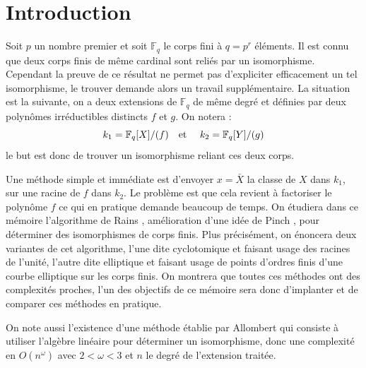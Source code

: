 \documentclass[a4paper]{article} %
\numberwithin{section}{part}
\numberwithin{equation}{section}
\newcommand\GF[1]{\mathbb{F}_{#1}}
\newcommand\etmath{\textup{\quad et \quad}}
\begin{document}
\part*{Introduction}
Soit $p$ un nombre premier et soit $\GF{q}$ le corps fini à $q = p^r$ éléments. 
Il est connu que deux corps finis de même cardinal sont reliés par un 
isomorphisme. Cependant la preuve de ce résultat ne permet pas d'expliciter
efficacement un tel isomorphisme, le trouver demande alors un travail 
supplémentaire. La situation est la suivante, on a deux extensions de 
$\GF{q}$ de même degré et définies par deux polynômes irréductibles distincts 
$f$ et $g$. On notera :
\[k_1=\GF{q}[X]/(f)\etmath k_2=\GF{q}[Y]/(g)\]
le but est donc de trouver un isomorphisme reliant ces deux corps.\par
Une méthode simple et immédiate est d'envoyer $x = \bar{X}$ la classe de $X$
dans $k_1$, sur une racine de $f$ dans $k_2$. Le problème est que cela revient à
factoriser le polynôme $f$ ce qui en pratique demande beaucoup de temps. On 
étudiera dans ce mémoire l'algorithme de Rains \cite{Rai}, amélioration d'une 
idée de Pinch \cite{Pin}, pour déterminer des isomorphismes de corps finis. Plus
précisément, on énoncera deux variantes de cet algorithme, l'une dite 
cyclotomique et faisant usage des racines de l'unité, l'autre dite elliptique et
faisant usage de points d'ordres finis d'une courbe elliptique sur les corps 
finis. On montrera que toutes ces méthodes ont des complexités proches, l'un des
objectifs de ce mémoire sera donc d'implanter et de comparer ces méthodes en 
pratique.\par
On note aussi l'existence d'une méthode établie par Allombert \cite{All} qui 
consiste à utiliser l'algèbre linéaire pour déterminer un isomorphisme, donc une
complexité en $O(n^{\omega})$ avec $2<\omega<3$ et $n$ le degré de l'extension
traitée.\par
\newpage
\end{document}
